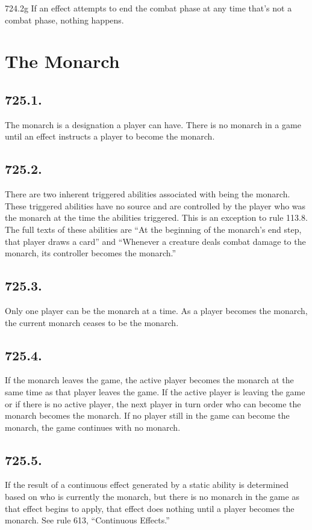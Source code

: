 724.2g If an effect attempts to end the combat phase at any time that’s not a combat phase, nothing happens.

\section{The Monarch}
\subsection*{725.1.}
The monarch is a designation a player can have. There is no monarch in a game until an effect instructs a player to become the monarch.

\subsection*{725.2.}
There are two inherent triggered abilities associated with being the monarch. These triggered abilities have no source and are controlled by the player who was the monarch at the time the abilities triggered. This is an exception to rule 113.8. The full texts of these abilities are “At the beginning of the monarch’s end step, that player draws a card” and “Whenever a creature deals combat damage to the monarch, its controller becomes the monarch.”

\subsection*{725.3.}
Only one player can be the monarch at a time. As a player becomes the monarch, the current monarch ceases to be the monarch.

\subsection*{725.4.}
If the monarch leaves the game, the active player becomes the monarch at the same time as that player leaves the game. If the active player is leaving the game or if there is no active player, the next player in turn order who can become the monarch becomes the monarch. If no player still in the game can become the monarch, the game continues with no monarch.

\subsection*{725.5.}
If the result of a continuous effect generated by a static ability is determined based on who is currently the monarch, but there is no monarch in the game as that effect begins to apply, that effect does nothing until a player becomes the monarch. See rule 613, “Continuous Effects.”

